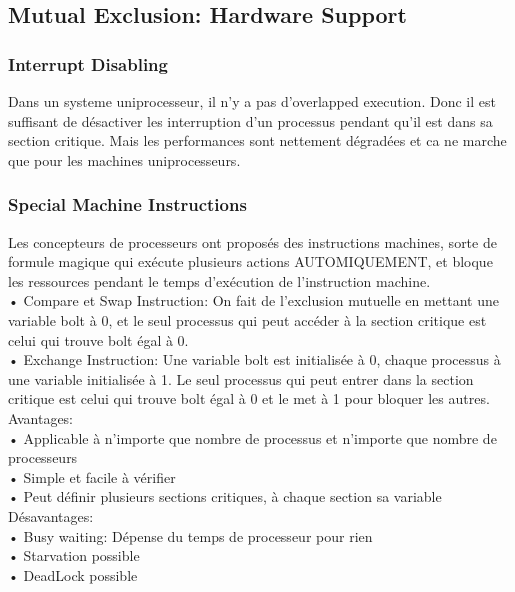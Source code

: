 \subsection{Mutual Exclusion: Hardware Support}
\subsubsection{Interrupt Disabling}
Dans un systeme uniprocesseur, il n’y a pas d’overlapped execution. Donc il est suffisant de désactiver les interruption d’un processus pendant qu’il est dans sa section critique. Mais les performances sont nettement dégradées et ca ne marche que pour les machines uniprocesseurs.
\subsubsection{Special Machine Instructions}
Les concepteurs de processeurs ont proposés des instructions machines, sorte de formule magique qui exécute plusieurs actions AUTOMIQUEMENT, et bloque les ressources pendant le temps d’exécution de l’instruction machine. \\
• Compare et Swap Instruction: On fait de l’exclusion mutuelle en mettant une variable bolt à 0, et le seul processus qui peut accéder à la section critique est celui qui trouve bolt égal à 0. \\
• Exchange Instruction: Une variable bolt est initialisée à 0, chaque processus à une variable initialisée à 1. Le seul processus qui peut entrer dans la section critique est celui qui trouve bolt égal à 0 et le met à 1 pour bloquer les autres. \\
Avantages: \\
• Applicable à n’importe que nombre de processus et n’importe que nombre de processeurs \\
• Simple et facile à vérifier \\
• Peut définir plusieurs sections critiques, à chaque section sa variable Désavantages: \\
• Busy waiting: Dépense du temps de processeur pour rien  \\
• Starvation possible\\
• DeadLock possible \\
